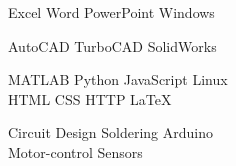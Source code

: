 Excel \textbullet{}   Word \textbullet{} PowerPoint \textbullet{} Windows \\
\sectionsep

AutoCAD  \textbullet{} TurboCAD \textbullet{} SolidWorks \\
\sectionsep

MATLAB \textbullet{} Python \textbullet{} JavaScript \textbullet{} Linux \\
HTML \textbullet{} CSS \textbullet{} HTTP \textbullet{} \LaTeX \\
\sectionsep

Circuit Design \textbullet{} Soldering \textbullet{} Arduino \\
Motor-control \textbullet{} Sensors \\
\sectionsep
